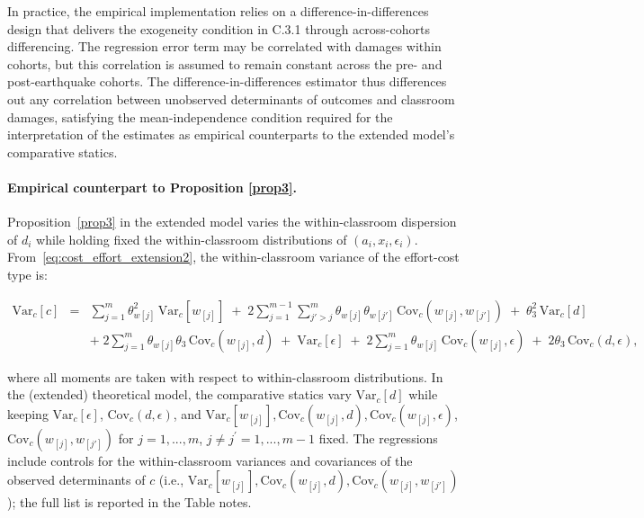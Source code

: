 In practice, the empirical implementation relies on a difference-in-differences design that delivers the exogeneity condition in C.3.1 through across-cohorts differencing. The regression error term may be correlated with damages within cohorts, but this correlation is assumed to remain constant across the pre- and post-earthquake cohorts. The difference-in-differences estimator thus differences out any correlation between unobserved determinants of outcomes and classroom damages, satisfying the mean-independence condition required for the interpretation of the estimates as empirical counterparts to the extended model’s comparative statics.



\paragraph{Empirical counterpart to Proposition \ref{prop3}.}
Proposition~\ref{prop3} in the extended model varies the within-classroom dispersion of $d_i$ while holding fixed the within-classroom distributions of $(a_i,x_i,\epsilon_i)$. From~\eqref{eq:cost_effort_extension2}, the within-classroom variance of the effort-cost type is:

\begin{eqnarray}\label{eq:var_cost_effort_extension_scalar}
\mathrm{Var}_c[c] 
&=& \sum_{j=1}^m \theta_{w[j]}^{2}\, \mathrm{Var}_c[w_{[j]}] 
\;+\; 2\sum_{j=1}^{m-1}\sum_{j'>j}^{m} \theta_{w[j]}\theta_{w[j']}\,\mathrm{Cov}_c(w_{[j]},w_{[j']})
\;+\; \theta_3^2\, \mathrm{Var}_c[d]  \\[6pt]
&& +\; 2\sum_{j=1}^{m} \theta_{w[j]}\theta_3\,\mathrm{Cov}_c(w_{[j]},d)
\;+\; \mathrm{Var}_c[\epsilon]
\;+\; 2\sum_{j=1}^{m} \theta_{w[j]}\,\mathrm{Cov}_c(w_{[j]},\epsilon)
\;+\; 2\theta_3\,\mathrm{Cov}_c(d,\epsilon), \nonumber
\end{eqnarray}





\noindent where all moments are taken with respect to within-classroom distributions. 
In the (extended) theoretical model, the comparative statics vary $\mathrm{Var}_c[d]$ while keeping $\mathrm{Var}_c[\epsilon]$, $\mathrm{Cov}_c(d,\epsilon)$, and $ \mathrm{Var}_c[w_{[j]}], \mathrm{Cov}_c(w_{[j]},d),  \mathrm{Cov}_c(w_{[j]},\epsilon)$, $\mathrm{Cov}_c(w_{[j]},w_{[j']})$ for $j=1,...,m$, $j\neq j^{'}=1,...,m-1$ fixed. The regressions include controls for the within-classroom variances and covariances of the observed determinants of $c$ (i.e.,  $ \mathrm{Var}_c[w_{[j]}], \mathrm{Cov}_c(w_{[j]},d),\mathrm{Cov}_c(w_{[j]},w_{[j']})$); the full list is reported in the Table notes. 


